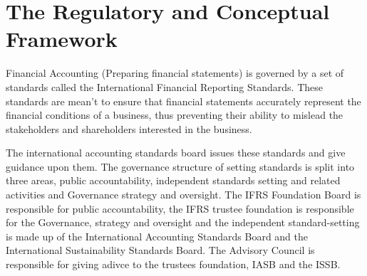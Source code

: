 \section{The Regulatory and Conceptual Framework}



Financial Accounting (Preparing financial statements) is governed by a set of standards called the International 
Financial Reporting Standards. These standards are mean't to ensure that financial statements accurately represent the 
financial conditions of a business, thus preventing their ability to mislead the stakeholders and shareholders interested in the 
business. 


The international accounting standards board issues these standards and give guidance upon them. The governance structure of setting standards is split into three areas, 
public accountability, independent standards setting and related activities and Governance strategy and oversight. The IFRS Foundation Board is responsible for public accountability, the IFRS trustee foundation 
is responsible for the Governance, strategy and oversight and the independent standard-setting is made up of the International Accounting Standards Board and the International Sustainability Standards Board. The Advisory Council is responsible for giving adivce to the trustees foundation, IASB 
and the ISSB. 

